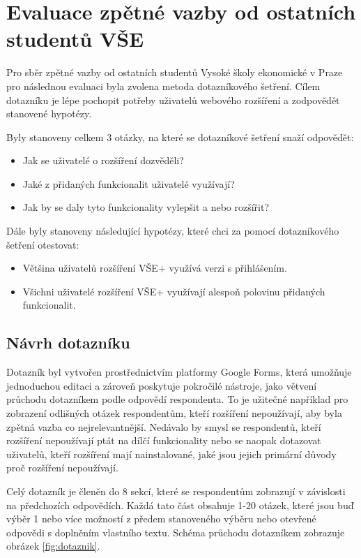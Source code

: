 \chapter{Evaluace zpětné vazby od ostatních studentů VŠE}

Pro sběr zpětné vazby od ostatních studentů Vysoké školy ekonomické v Praze pro následnou evaluaci byla zvolena metoda dotazníkového šetření. Cílem dotazníku je lépe pochopit potřeby uživatelů webového rozšíření a zodpovědět stanovené hypotézy.

Byly stanoveny celkem 3 otázky, na které se dotazníkové šetření snaží odpovědět:

\begin{itemize}
    \item Jak se uživatelé o rozšíření dozvěděli?
    \item Jaké z přidaných funkcionalit uživatelé využívají?
    \item Jak by se daly tyto funkcionality vylepšit a nebo rozšířit?
\end{itemize}

Dále byly stanoveny následující hypotézy, které chci za pomocí dotazníkového šetření otestovat:

\begin{itemize}
    \item Většina uživatelů rozšíření VŠE+ využívá verzi s přihlášením.
    \item Všichni uživatelé rozšíření VŠE+ využívají alespoň polovinu přidaných funkcionalit.
\end{itemize}

\section{Návrh dotazníku}

Dotazník byl vytvořen prostřednictvím platformy Google Forms, která umožňuje jednoduchou editaci a zároveň poskytuje pokročilé nástroje, jako větvení průchodu dotazníkem podle odpovědí respondenta. To je užitečné například pro zobrazení odlišných otázek respondentům, kteří rozšíření nepoužívají, aby byla zpětná vazba co nejrelevantnější. Nedávalo by smysl se respondentů, kteří rozšíření nepoužívají ptát na dílčí funkcionality nebo se naopak dotazovat uživatelů, kteří rozšíření mají nainstalované, jaké jsou jejich primární důvody proč rozšíření nepoužívají. 

Celý dotazník je členěn do 8 sekcí, které se respondentům zobrazují v závislosti na předchozích odpovědích. Každá tato část obsahuje 1-20 otázek, které jsou buď výběr 1 nebo více možností z předem stanoveného výběru nebo otevřené odpovědi s doplněním vlastního textu. Schéma průchodu dotazníkem zobrazuje obrázek \ref{fig:dotaznik}.

